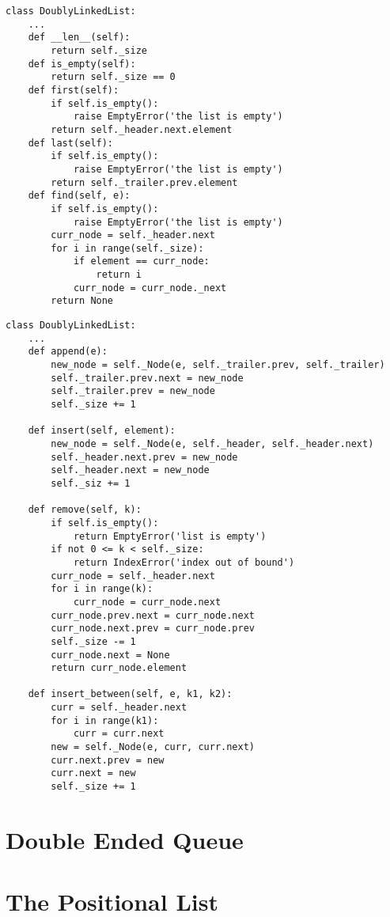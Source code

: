 \documentclass[10pt]{article}
\begin{document}
\begin{verbatim}
class DoublyLinkedList:
    ...
    def __len__(self):
        return self._size
    def is_empty(self):
        return self._size == 0
    def first(self):
        if self.is_empty():
            raise EmptyError('the list is empty')
        return self._header.next.element
    def last(self):
        if self.is_empty():
            raise EmptyError('the list is empty')
        return self._trailer.prev.element
    def find(self, e):
        if self.is_empty():
            raise EmptyError('the list is empty')
        curr_node = self._header.next
        for i in range(self._size):
            if element == curr_node:
                return i
            curr_node = curr_node._next
        return None
\end{verbatim}

\begin{verbatim}
class DoublyLinkedList:
    ...
    def append(e):
        new_node = self._Node(e, self._trailer.prev, self._trailer)
        self._trailer.prev.next = new_node
        self._trailer.prev = new_node
        self._size += 1
        
    def insert(self, element):
        new_node = self._Node(e, self._header, self._header.next)
        self._header.next.prev = new_node
        self._header.next = new_node
        self._siz += 1
    
    def remove(self, k):
        if self.is_empty():
            return EmptyError('list is empty')
        if not 0 <= k < self._size:
            return IndexError('index out of bound')
        curr_node = self._header.next
        for i in range(k):
            curr_node = curr_node.next
        curr_node.prev.next = curr_node.next
        curr_node.next.prev = curr_node.prev
        self._size -= 1
        curr_node.next = None
        return curr_node.element
        
    def insert_between(self, e, k1, k2):
        curr = self._header.next
        for i in range(k1):
            curr = curr.next
        new = self._Node(e, curr, curr.next)
        curr.next.prev = new
        curr.next = new
        self._size += 1
\end{verbatim}

\section{Double Ended Queue}


\section{The Positional List}
\end{document}
